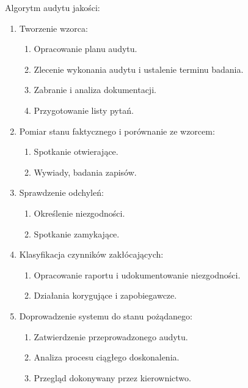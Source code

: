 Algorytm audytu jakości:
\begin{enumerate}

\item Tworzenie wzorca:

\begin{enumerate}

\item Opracowanie planu audytu.
\item Zlecenie wykonania audytu i ustalenie terminu badania.
\item Zabranie i analiza dokumentacji.
\item Przygotowanie listy pytań.

\end{enumerate}

\item Pomiar stanu faktycznego i porównanie ze wzorcem:

\begin{enumerate}

\item Spotkanie otwierające.
\item Wywiady, badania zapisów.

\end{enumerate}

\item Sprawdzenie odchyleń:

\begin{enumerate}

\item Określenie niezgodności.
\item Spotkanie zamykające.

\end{enumerate}


\item Klasyfikacja czynników zakłócających:

\begin{enumerate}

\item Opracowanie raportu i udokumentowanie niezgodności.
\item Działania korygujące i zapobiegawcze.

\end{enumerate}

\item Doprowadzenie systemu do stanu pożądanego:

\begin{enumerate}

\item Zatwierdzenie przeprowadzonego audytu.
\item Analiza procesu ciągłego doskonalenia.
\item Przegląd dokonywany przez kierownictwo.
\end{enumerate}
\end{enumerate}

